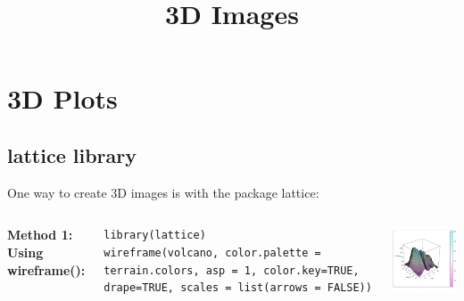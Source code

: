 

\section{3D Plots}
\subsection{\ttfamily lattice \normalfont library}

%		

\begin{frame}[fragile]
\title{3D Images}

One way to create 3D images is with the package \ttfamily lattice: \normalfont 

    \begin{columns}
\bf{Method 1:} \normalfont Using \ttfamily wireframe(): \normalfont 
\begin{lstlisting}
library(lattice)
wireframe(volcano, color.palette = terrain.colors, asp = 1, color.key=TRUE, drape=TRUE, scales = list(arrows = FALSE))
\end{lstlisting}

       \begin{center}
\includegraphics[width = 55mm]{images/wireframe.pdf}
\end{center}
\end{columns}
\end{frame}

